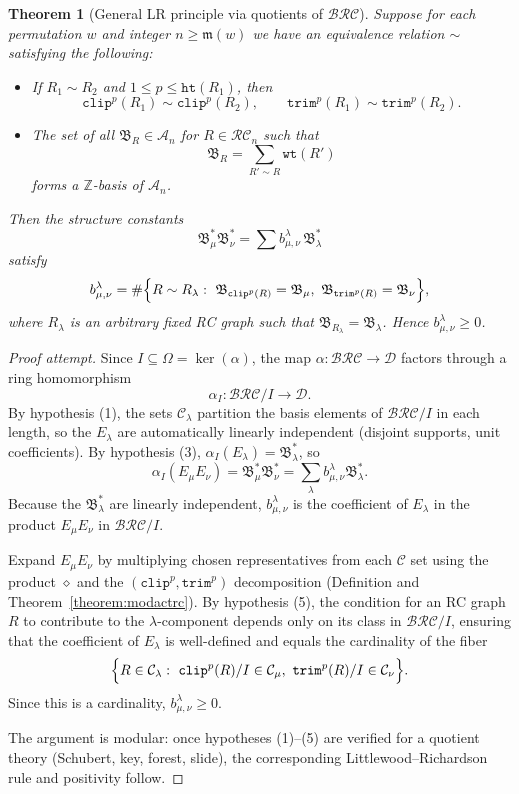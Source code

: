 \documentclass{amsart}
\newtheorem{theorem}{Theorem}[section]
\theoremstyle{definition}
\theoremstyle{remark}
\numberwithin{equation}{subsection}
\newcommand{\wtt}{\mathtt{wt}}
\newcommand{\trm}{\mathtt{trim}}
\newcommand{\hr}{\mathtt{ht}}
\newcommand{\clp}{\mathtt{clip}}
\newcommand{\BRC}{\mathcal{BRC}}
\newcommand{\RC}{\mathcal{RC}}
\newcommand{\coma}{\mathcal{A}}
\newcommand{\dcoma}{\mathcal{D}}
\newcommand{\maxd}{\mathfrak{m}}
\begin{document}
\begin{theorem}[General LR principle via quotients of $\BRC$]\label{theorem:general_lr_template}
Suppose for each permutation $w$ and integer $n\geq \maxd(w)$ we have an equivalence relation $\sim$ satisfying the following:
\begin{itemize}
\item[(1)] If $R_1\sim R_2$ and $1\leq p\leq \hr(R_1)$, then
$$\clp^p(R_1)\sim \clp^p(R_2),\qquad \trm^p(R_1)\sim \trm^p(R_2).$$
\item[(2)] The set of all $\mathfrak{B}_R\in\coma_n$ for $R\in\RC_n$ such that
$$\mathfrak{B}_R = \sum_{R'\sim R} \wtt(R')$$
forms a $\mathbb{Z}$-basis of $\coma_n$.
\end{itemize}
Then the structure constants
$$\mathfrak{B}_\mu^*\mathfrak{B}_\nu^*=\sum b_{\mu,\nu}^{\lambda}\, \mathfrak{B}_\lambda^*$$
satisfy
$$b_{\mu,\nu}^{\lambda}=\#\Bigl\{R\sim R_\lambda:\ \mathfrak{B}_{\clp^p(R)}=\mathfrak{B}_\mu,\ \mathfrak{B}_{\trm^p(R)}=\mathfrak{B}_\nu\Bigr\},$$
where $R_\lambda$ is an arbitrary fixed RC graph such that $\mathfrak{B}_{R_\lambda}=\mathfrak{B}_\lambda$. Hence $b_{\mu,\nu}^{\lambda}\geq 0$.
\end{theorem}

\begin{proof}[Proof attempt]
Since $I\subseteq\Omega=\ker(\alpha)$, the map $\alpha:\BRC\to\dcoma$ factors through a ring homomorphism
$$\alpha_I:\BRC/I\to\dcoma.$$
By hypothesis (1), the sets $\mathcal{C}_\lambda$ partition the basis elements of $\BRC/I$ in each length, so the $E_\lambda$ are automatically linearly independent (disjoint supports, unit coefficients). By hypothesis (3), $\alpha_I(E_\lambda)=\mathfrak{B}_\lambda^*$, so
$$\alpha_I(E_\mu E_\nu)=\mathfrak{B}_\mu^*\mathfrak{B}_\nu^*=\sum_\lambda b_{\mu,\nu}^{\lambda}\mathfrak{B}_\lambda^*.$$
Because the $\mathfrak{B}_\lambda^*$ are linearly independent, $b_{\mu,\nu}^{\lambda}$ is the coefficient of $E_\lambda$ in the product $E_\mu E_\nu$ in $\BRC/I$.

Expand $E_\mu E_\nu$ by multiplying chosen representatives from each $\mathcal{C}$ set using the product $\diamond$ and the $(\clp^p,\trm^p)$ decomposition (Definition and Theorem~\ref{theorem:modactrc}). By hypothesis (5), the condition for an RC graph $R$ to contribute to the $\lambda$-component depends only on its class in $\BRC/I$, ensuring that the coefficient of $E_\lambda$ is well-defined and equals the cardinality of the fiber
$$\Bigl\{R\in\mathcal{C}_\lambda:\ \clp^p(R)/I\in \mathcal{C}_\mu,\ \trm^p(R)/I\in \mathcal{C}_\nu\Bigr\}.$$
Since this is a cardinality, $b_{\mu,\nu}^{\lambda}\geq 0$.

The argument is modular: once hypotheses (1)--(5) are verified for a quotient theory (Schubert, key, forest, slide), the corresponding Littlewood--Richardson rule and positivity follow.
\end{proof}
\end{document}
